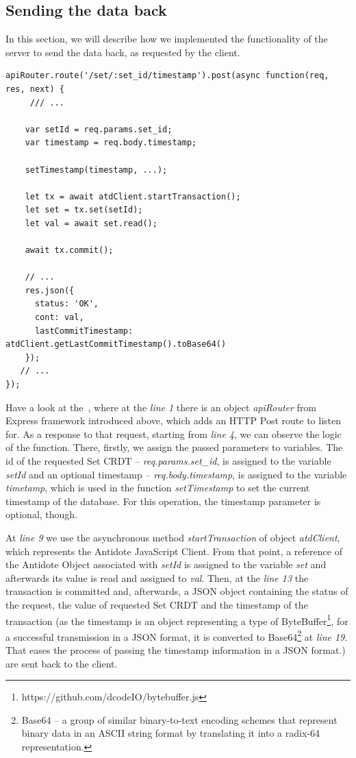 \subsection*{Sending the data back}

In this section, we will describe how we implemented the functionality of the server to send the data back, as requested by the client.

\begin{lstlisting}[caption={Code for sending back to the client the requested data.}, label={lst:dev1}]
apiRouter.route('/set/:set_id/timestamp').post(async function(req, res, next) {   
     /// ...
    
    var setId = req.params.set_id;
    var timestamp = req.body.timestamp;

    setTimestamp(timestamp, ...);

    let tx = await atdClient.startTransaction();
    let set = tx.set(setId);
    let val = await set.read();

    await tx.commit();

    // ...
    res.json({
      status: 'OK',
      cont: val,
      lastCommitTimestamp: atdClient.getLastCommitTimestamp().toBase64()
    });
   // ... 
});
\end{lstlisting} 

Have a look at the~, where at the \textit{line 1} there is an object \textit{apiRouter} from Express framework introduced above, which adds an HTTP Post route to listen for. As a response to that request, starting from \textit{line 4}, we can observe the logic of the function. There, firstly, we assign the passed parameters to variables. The id of the requested Set CRDT -- \textit{req.params.set\_id}, is assigned to the variable \textit{setId} and an optional timestamp -- \textit{req.body.timestamp}, is assigned to the variable \textit{timetamp}, which is used in the function \textit{setTimestamp} to set the current timestamp of the database. For this operation, the timestamp parameter is optional, though.

At \textit{line 9} we use the asynchronous method \textit{startTransaction} of object \textit{atdClient}, which represents the Antidote JavaScript Client. From that point, a reference of the Antidote Object associated with \textit{setId} is assigned to the variable \textit{set} and afterwards its value is read and assigned to \textit{val}. Then, at the \textit{line 13} the transaction is committed and, afterwards, a JSON object containing the status of the request, the value of requested Set CRDT and the timestamp of the transaction (as the timestamp is an object representing a type of ByteBuffer\footnote{https://github.com/dcodeIO/bytebuffer.js}, for a successful transmission in a JSON format, it is converted to Base64\footnote{Base64 -- a group of similar binary-to-text encoding schemes that represent binary data in an ASCII string format by translating it into a radix-64 representation\cite{53}.} at \textit{line 19}. That eases the process of passing the timestamp information in a JSON format.) are sent back to the client.

